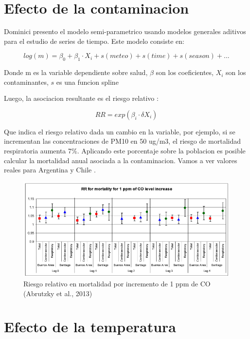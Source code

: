 \documentclass[]{book}
\begin{document}
\hypertarget{efecto-de-la-contaminacion}{%
\section{Efecto de la contaminacion}\label{efecto-de-la-contaminacion}}

Dominici presento el modelo semi-parametrico usando modelos generales aditivos \citep{gam} para el estudio de series de tiempo. Este modelo consiste en:

\begin{equation}
log(m) = \beta_0 + \beta_1 \cdot X_i + s(meteo) + s(time) + s(season) + ...
\label{eq:13}
\end{equation}

Donde m es la variable dependiente sobre salud, \(\beta\) son los coeficientes, \(X_i\) son los contaminantes, \(s\) es una funcion spline

Luego, la asociacion resultante es el riesgo relativo \citep{rosana}:

\begin{equation}
RR = exp(\beta_i \cdot \delta X_i)
\label{eq:13}
\end{equation}

Que indica el riesgo relativo dada un cambio en la variable, por ejemplo, si se incrementan las concentraciones de PM10 en 50 ug/m3, el riesgo de mortalidad respiratoria aumenta 7\%. Aplicando este porcentaje sobre la poblacion es posible calcular la mortalidad anual asociada a la contaminacion. Vamos a ver valores reales para Argentina y Chile \citep{rosana}.

\begin{figure}
\includegraphics[width=11.44in,height=1.8\textheight]{figs/rosana1} \caption{Riesgo relativo en mortalidad por incremento de 1 ppm de CO (Abrutzky et al., 2013)}\label{fig:unnamed-chunk-65}
\end{figure}

\hypertarget{efecto-de-la-temperatura}{%
\section{Efecto de la temperatura}\label{efecto-de-la-temperatura}}
\end{document}
